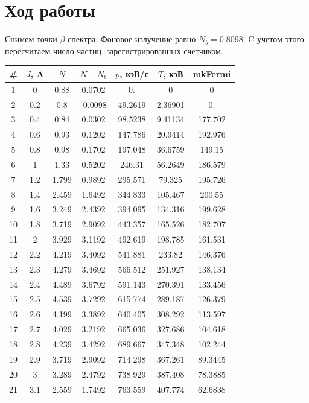 \documentclass[a4paper, 12pt]{article}
\begin{document}
		\section{Ход работы}
		Снимем точки $\beta$-спектра. Фоновое излучение равно $N_b = 0.8098$. C учетом этого пересчитаем число частиц, зарегистрированных счетчиком.
		\begin{table}[!htb]
			\centering
			\begin{tabular}{|c|c|c|c|c|c|c|}
				\hline
				\# & $J$, A & $N$ & $N-N_b$ & $p$, кэВ/с & $T$, кэВ & mkFermi\\
				\hline
				1 & 0 & 0.88 & 0.0702 & 0. & 0 & 0 \\
 2 & 0.2 & 0.8 & -0.0098 & 49.2619 & 2.36901 & 0. \\
 3 & 0.4 & 0.84 & 0.0302 & 98.5238 & 9.41134 & 177.702 \\
 4 & 0.6 & 0.93 & 0.1202 & 147.786 & 20.9414 & 192.976 \\
 5 & 0.8 & 0.98 & 0.1702 & 197.048 & 36.6759 & 149.15 \\
 6 & 1 & 1.33 & 0.5202 & 246.31 & 56.2649 & 186.579 \\
 7 & 1.2 & 1.799 & 0.9892 & 295.571 & 79.325 & 195.726 \\
 8 & 1.4 & 2.459 & 1.6492 & 344.833 & 105.467 & 200.55 \\
 9 & 1.6 & 3.249 & 2.4392 & 394.095 & 134.316 & 199.628 \\
 10 & 1.8 & 3.719 & 2.9092 & 443.357 & 165.526 & 182.707 \\
 11 & 2 & 3.929 & 3.1192 & 492.619 & 198.785 & 161.531 \\
 12 & 2.2 & 4.219 & 3.4092 & 541.881 & 233.82 & 146.376 \\
 13 & 2.3 & 4.279 & 3.4692 & 566.512 & 251.927 & 138.134 \\
 14 & 2.4 & 4.489 & 3.6792 & 591.143 & 270.391 & 133.456 \\
 15 & 2.5 & 4.539 & 3.7292 & 615.774 & 289.187 & 126.379 \\
 16 & 2.6 & 4.199 & 3.3892 & 640.405 & 308.292 & 113.597 \\
 17 & 2.7 & 4.029 & 3.2192 & 665.036 & 327.686 & 104.618 \\
 18 & 2.8 & 4.239 & 3.4292 & 689.667 & 347.348 & 102.244 \\
 19 & 2.9 & 3.719 & 2.9092 & 714.298 & 367.261 & 89.3445 \\
 20 & 3 & 3.289 & 2.4792 & 738.929 & 387.408 & 78.3885 \\
 21 & 3.1 & 2.559 & 1.7492 & 763.559 & 407.774 & 62.6838 \\

\end{tabular}
\end{table}
\end{document}

